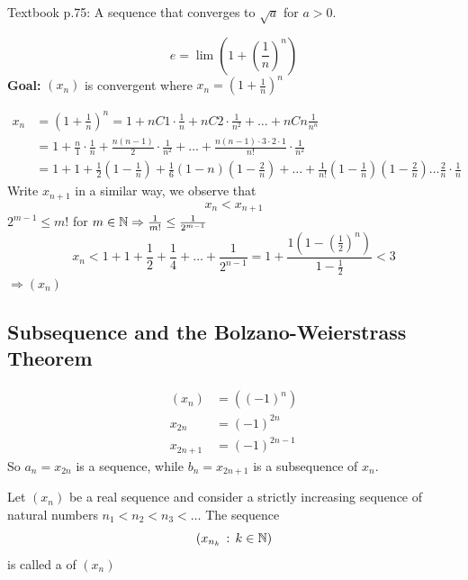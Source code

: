 \documentclass[a4paper,12pt]{article}
\begin{document}
Textbook p.75: A sequence that converges to \(\sqrt{a}\) for \(a>0\).\newpage
\begin{definition}
    \[e = \lim(1+(\frac{1}{n})^n)\]
    \textbf{Goal: } \((x_n)\) is convergent where \(x_n=(1+\frac{1}{n})^n\)
    
    \begin{align*}
        x_n & = (1+\frac{1}{n})^n=1+nC1\cdot\frac{1}{n}+nC2\cdot\frac{1}{n^2}+\dots+nCn\frac{1}{n^n}\\
        & = 1+\frac{n}{1}\cdot\frac{1}{n}+\frac{n(n-1)}{2}\cdot\frac{1}{n^2}+\dots+\frac{n(n-1)\cdot3\cdot2\cdot1}{n!}\cdot\frac{1}{n^2}\\   
        & = 1 + 1+\frac{1}{2}(1-\frac{1}{n})+\frac{1}{6}(1-n)(1-\frac{2}{n})+\dots+\frac{1}{n!}(1-\frac{1}{n})(1-\frac{2}{n})\dots\frac{2}{n}\cdot\frac{1}{n}
    \end{align*}
    Write \(x_{n+1}\) in a similar way, we observe that \[x_n < x_{n+1}\]
     \(2^{m-1}\le m!\) for \(m \in \mathbb{N}\Rightarrow \frac{1}{m!}\le\frac{1}{2^{m-1}}\)
    \[x_n<1+1+\frac{1}{2}+\frac{1}{4}+\dots+\frac{1}{2^{n-1}} = 1+\frac{1(1-(\frac{1}{2})^n)}{1-\frac{1}{2}}<3\]
    \(\Rightarrow(x_n) \)
\end{definition}

\newpage

\subsection{Subsequence and the Bolzano-Weierstrass Theorem}
\begin{example}
    \begin{align*}
        (x_n) &= ((-1)^n)\\
        x_{2n} &= (-1)^{2n}\\
        x_{2n+1} &= (-1)^{2n-1}
    \end{align*}
    So \(a_n = x_{2n}\) is a sequence, while \(b_n = x_{2n+1}\) is a subsequence of \(x_n\).
\end{example}

\begin{definition}
    Let \((x_n)\) be a real sequence and consider a strictly increasing sequence of natural numbers 
    \(n_1<n_2<n_3<\dots\)
    The sequence \[(x_{n_k}\,:\,k\in\mathbb{N})\]
    is called a  of \((x_n)\)\\
\end{definition}
\end{document}
